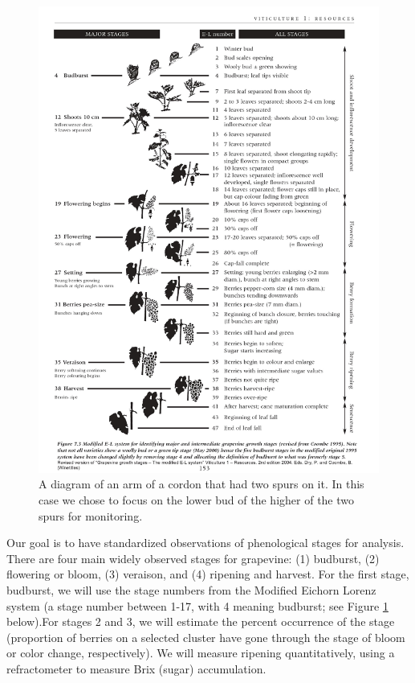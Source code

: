 \documentclass[11pt,letter]{article}
\begin{document}
\begin{figure}%
  \includegraphics[width=\linewidth]{ELScale.jpg}
  \caption{A diagram of an arm of a cordon that had two spurs on it. In this case we chose to focus on the lower bud of the higher of the two spurs for monitoring. }
  \label{fig:ELScale}
\end{figure}

Our goal is to have standardized observations of phenological stages for analysis. There are four main widely observed stages for grapevine: (1) budburst, (2) flowering or bloom, (3) veraison, and (4) ripening and harvest. For the first stage, budburst, we will use the stage numbers from the Modified Eichorn Lorenz system (a stage number between 1-17, with 4 meaning budburst; see Figure \ref{fig:ELScale} below).For stages 2 and 3, we will estimate the percent occurrence of the stage (proportion of berries on a selected cluster have gone through the stage of bloom or color change, respectively). We will measure ripening quantitatively, using a refractometer to measure Brix (sugar) accumulation. 
\end{document}
